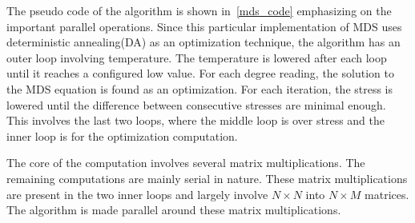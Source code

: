 \documentclass[conference]{IEEEtran}
\begin{document}
The pseudo code of the algorithm is shown in~\ref{mds_code} emphasizing on the important parallel operations. Since this particular implementation of MDS uses deterministic annealing(DA) as an optimization technique, the algorithm has an outer loop involving temperature. The temperature is lowered after each loop until it reaches a configured low value. For each degree reading, the solution to the MDS equation is found as an optimization. For each iteration, the stress is lowered until the difference between consecutive stresses are minimal enough. This involves the last two loops, where the middle loop is over stress and the inner loop is for the optimization computation.

The core of the computation involves several matrix multiplications. The remaining computations are mainly serial in nature. These matrix multiplications are present in the two inner loops and largely involve $N \times N$ into $N \times M$ matrices. The algorithm is made parallel around these matrix multiplications.
\end{document}
